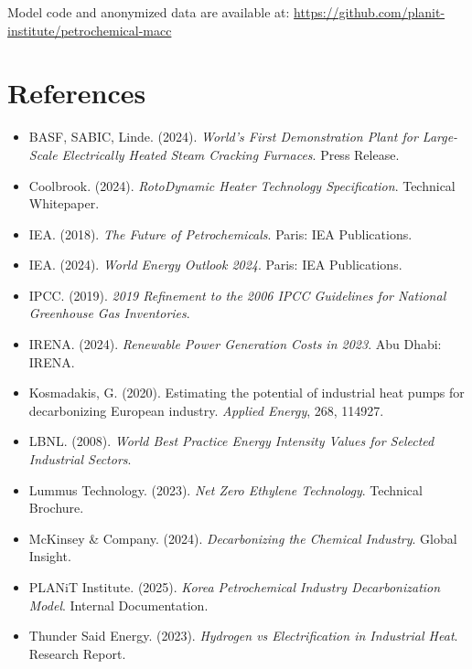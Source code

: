 \documentclass[12pt,a4paper]{article}
\begin{document}
Model code and anonymized data are available at: \url{https://github.com/planit-institute/petrochemical-macc}

\section*{References}

\begin{itemize}
    \item BASF, SABIC, Linde. (2024). \textit{World's First Demonstration Plant for Large-Scale Electrically Heated Steam Cracking Furnaces}. Press Release.
    \item Coolbrook. (2024). \textit{RotoDynamic Heater Technology Specification}. Technical Whitepaper.
    \item IEA. (2018). \textit{The Future of Petrochemicals}. Paris: IEA Publications.
    \item IEA. (2024). \textit{World Energy Outlook 2024}. Paris: IEA Publications.
    \item IPCC. (2019). \textit{2019 Refinement to the 2006 IPCC Guidelines for National Greenhouse Gas Inventories}.
    \item IRENA. (2024). \textit{Renewable Power Generation Costs in 2023}. Abu Dhabi: IRENA.
    \item Kosmadakis, G. (2020). Estimating the potential of industrial heat pumps for decarbonizing European industry. \textit{Applied Energy}, 268, 114927.
    \item LBNL. (2008). \textit{World Best Practice Energy Intensity Values for Selected Industrial Sectors}.
    \item Lummus Technology. (2023). \textit{Net Zero Ethylene Technology}. Technical Brochure.
    \item McKinsey \& Company. (2024). \textit{Decarbonizing the Chemical Industry}. Global Insight.
    \item PLANiT Institute. (2025). \textit{Korea Petrochemical Industry Decarbonization Model}. Internal Documentation.
    \item Thunder Said Energy. (2023). \textit{Hydrogen vs Electrification in Industrial Heat}. Research Report.
\end{itemize}
\end{document}
